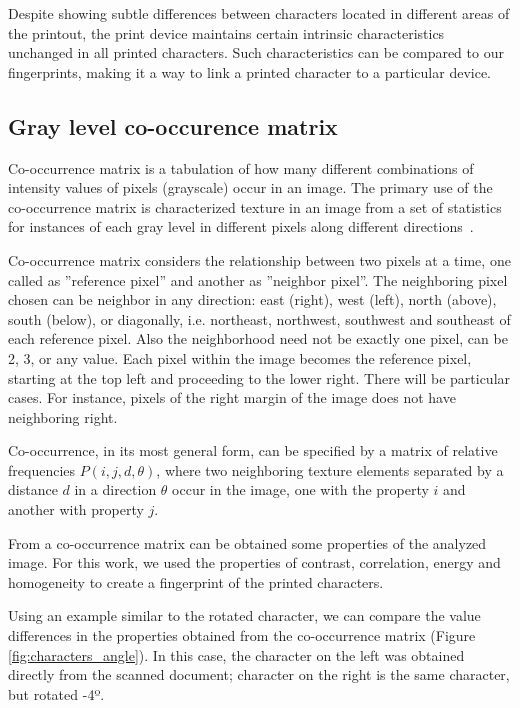 \documentclass[10pt,twocolumn,letterpaper]{article}
\begin{document}
Despite showing subtle differences between characters located in different areas of the printout, the print device maintains certain intrinsic characteristics unchanged in all printed characters. Such characteristics can be compared to our fingerprints, making it a way to link a printed character to a particular device.

\subsection{Gray level co-occurence matrix}
\label{subsec:co-occurence_matrix}

Co-occurrence matrix is a tabulation of how many different combinations of intensity values of pixels (grayscale) occur in an image. The primary use of the co-occurrence matrix is characterized texture in an image from a set of statistics for instances of
each gray level in different pixels along different directions~\cite{Rocha}.

Co-occurrence matrix considers the relationship between two pixels at a time, one called as ''reference pixel'' and another as ''neighbor pixel''. The neighboring pixel chosen can be neighbor in any direction: east (right), west (left), north (above), south (below), or diagonally, i.e. northeast, northwest, southwest and southeast of each reference pixel. Also the neighborhood need not be exactly one pixel, can be 2, 3, or any value. Each pixel within the image becomes the reference pixel, starting at the top left and proceeding to the lower right. There will be particular cases. For instance, pixels of the right margin of the image does not have neighboring right.

Co-occurrence, in its most general form, can be specified by a matrix of relative frequencies $P (i, j, d,\theta)$, where two neighboring texture elements separated by a distance $d$ in a direction $\theta$ occur in the image, one with the property $i$ and another with property $j$.

From a co-occurrence matrix can be obtained some properties of the analyzed image. For this work, we used the properties of contrast, correlation, energy and homogeneity to create a fingerprint of the printed characters.

Using an example similar to the rotated character, we can compare the value differences in the properties obtained from the co-occurrence matrix (Figure \ref{fig:characters_angle}). In this case, the character on the left was obtained directly from the scanned document; character on the right is the same character, but rotated -4º.
\end{document}
